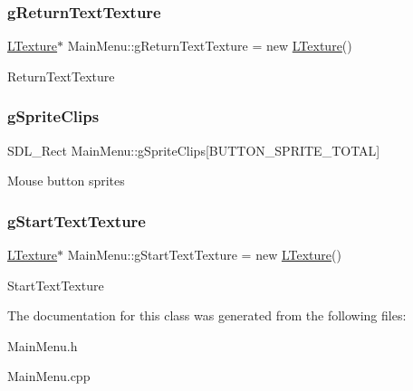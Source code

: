 \subsubsection{\texorpdfstring{g\+Return\+Text\+Texture}{gReturnTextTexture}}
{\footnotesize\ttfamily \mbox{\hyperlink{class_l_texture}{L\+Texture}}$\ast$ Main\+Menu\+::g\+Return\+Text\+Texture = new \mbox{\hyperlink{class_l_texture}{L\+Texture}}()\hspace{0.3cm}{\ttfamily [private]}}

Return\+Text\+Texture \mbox{\label{class_main_menu_adda2f50937b2c2c6b98d22785bbd18a6}} 
\subsubsection{\texorpdfstring{g\+Sprite\+Clips}{gSpriteClips}}
{\footnotesize\ttfamily S\+D\+L\+\_\+\+Rect Main\+Menu\+::g\+Sprite\+Clips\mbox{[}B\+U\+T\+T\+O\+N\+\_\+\+S\+P\+R\+I\+T\+E\+\_\+\+T\+O\+T\+AL\mbox{]}\hspace{0.3cm}{\ttfamily [private]}}

Mouse button sprites \mbox{\label{class_main_menu_ad503eaed21ec90d1971ec1577095b7b6}} 
\subsubsection{\texorpdfstring{g\+Start\+Text\+Texture}{gStartTextTexture}}
{\footnotesize\ttfamily \mbox{\hyperlink{class_l_texture}{L\+Texture}}$\ast$ Main\+Menu\+::g\+Start\+Text\+Texture = new \mbox{\hyperlink{class_l_texture}{L\+Texture}}()\hspace{0.3cm}{\ttfamily [private]}}

Start\+Text\+Texture 

The documentation for this class was generated from the following files\+:\begin{DoxyCompactItemize}
\item 
Main\+Menu.\+h\item 
Main\+Menu.\+cpp\end{DoxyCompactItemize}
